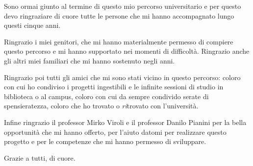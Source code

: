 

Sono ormai giunto al termine di questo mio percorso universitario
e per questo devo ringraziare di cuore tutte le persone che mi hanno accompagnato lungo questi cinque anni.

Ringrazio i miei genitori, che mi hanno materialmente permesso di compiere questo percorso e mi hanno supportato nei momenti di difficoltà.
Ringrazio anche gli altri miei familiari che mi hanno sostenuto negli anni.

Ringrazio poi tutti gli amici che mi sono stati vicino in questo percorso:
coloro con cui ho condiviso i progetti ingestibili e le infinite sessioni di studio in biblioteca o al campus,
coloro con cui da sempre condivido serate di spensieratezza,
coloro che ho trovato o \emph{ri}trovato con l'università.

Infine ringrazio il professor Mirko Viroli e il professor Danilo Pianini
per la bella opportunità che mi hanno offerto,
per l'aiuto datomi per realizzare questo progetto
e per le competenze che mi hanno permesso di sviluppare.

Grazie a tutti, di cuore.
